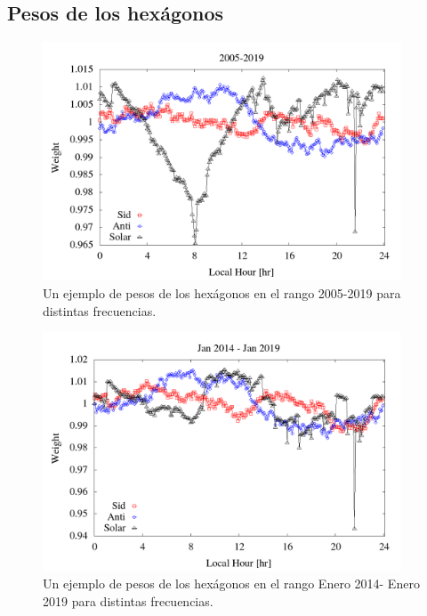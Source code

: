  



\subsection{Pesos de los hexágonos}


\begin{figure}[htbp]
  \centering
  \includegraphics[width=0.95\textwidth]{../report_2_27_04_2020/Graficos/weigth2005-2019.png}
  \caption{Un ejemplo de pesos de los hexágonos en el rango 2005-2019 para distintas frecuencias.}
\end{figure}

 


\begin{figure}[htbp]
  \centering
  \includegraphics[width=0.95\textwidth]{../../Plotting/weigth2014-2019_jan.png}
  \caption{Un ejemplo de pesos de los hexágonos en el rango Enero 2014- Enero 2019 para distintas frecuencias.}
\end{figure}

